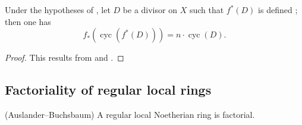 \begin{corollary}[21.10.19]
\label{IV.21.10.19}
Under the hypotheses of , let $D$ be a divisor on $X$ such that $f^*(D)$ is defined ;
then one has
\[
\label{IV.21.10.19.1}
  f_*(\operatorname{cyc}(f^*(D)))=n\cdot\operatorname{cyc}(D).
  \tag{21.10.19.1}
\]
\end{corollary}

\begin{proof}
This results from  and .
\end{proof}

\subsection{Factoriality of regular local rings}
\label{IV.21.11}

\begin{theorem}[21.11.1]
\label{IV.21.11.1}
\textnormal{(Auslander--Buchsbaum)}
A regular local Noetherian ring is factorial.
\end{theorem}

